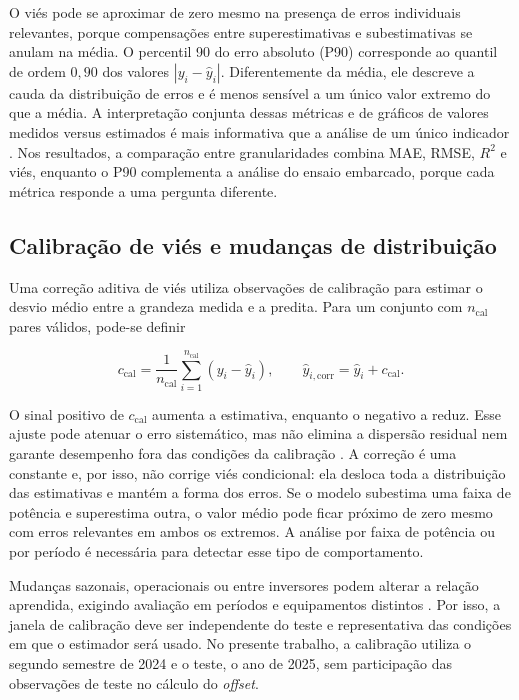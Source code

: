 O viés pode se aproximar de zero mesmo na presença de erros individuais
relevantes, porque compensações entre superestimativas e subestimativas
se anulam na média. O percentil 90 do erro absoluto (P90) corresponde ao
quantil de ordem $0{,}90$ dos valores $|y_i-\hat y_i|$. Diferentemente da
média, ele descreve a cauda da distribuição de erros e é menos sensível a
um único valor extremo do que a média. A interpretação conjunta dessas métricas e de
gráficos de valores medidos versus estimados é mais informativa que a
análise de um único indicador \cite{chicco2021,hodson2022}. Nos
resultados, a comparação entre granularidades combina MAE, RMSE, $R^2$ e
viés, enquanto o P90 complementa a análise do ensaio embarcado, porque
cada métrica responde a uma pergunta diferente.

\subsection{Calibração de viés e mudanças de distribuição}
\label{subsec:ft-calibracao}

Uma correção aditiva de viés utiliza observações de calibração para
estimar o desvio médio entre a grandeza medida e a predita. Para um
conjunto com $n_{\mathrm{cal}}$ pares válidos, pode-se definir

\begin{equation}
\label{eq:offset_calibracao}
c_{\mathrm{cal}}=\frac{1}{n_{\mathrm{cal}}}
\sum_{i=1}^{n_{\mathrm{cal}}}(y_i-\hat y_i),
\qquad
\hat y_{i,\mathrm{corr}}=\hat y_i+c_{\mathrm{cal}}.
\end{equation}

O sinal positivo de $c_{\mathrm{cal}}$ aumenta a estimativa, enquanto o
negativo a reduz. Esse ajuste pode atenuar o erro sistemático, mas não
elimina a dispersão residual nem garante desempenho fora das condições
da calibração \cite{koo2022calibracao}. A correção é uma constante e,
por isso, não corrige viés condicional: ela desloca toda a distribuição
das estimativas e mantém a forma dos erros. Se o modelo subestima uma
faixa de potência e superestima outra, o valor médio pode ficar próximo
de zero mesmo com erros relevantes em ambos os extremos. A análise por
faixa de potência ou por período é necessária para detectar esse tipo de
comportamento.

Mudanças sazonais, operacionais ou entre inversores podem alterar a
relação aprendida, exigindo avaliação em períodos e equipamentos
distintos \cite{zhang2023drift}. Por isso, a janela de calibração deve ser
independente do teste e representativa das condições em que o estimador
será usado. No presente trabalho, a calibração utiliza o segundo
semestre de 2024 e o teste, o ano de 2025, sem participação das
observações de teste no cálculo do \textit{offset}.

